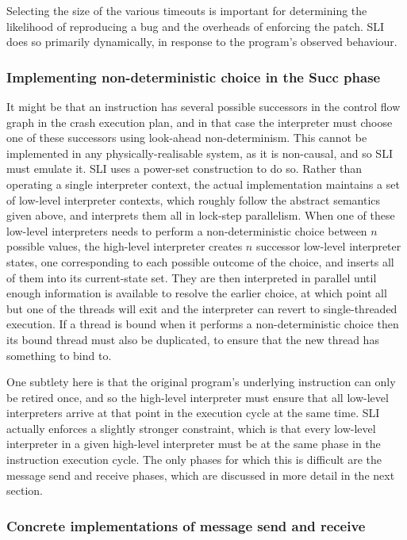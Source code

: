 Selecting the size of the various timeouts is important for determining the likelihood of reproducing a bug and the overheads of enforcing the patch.
SLI does so primarily dynamically, in response to the program's observed behaviour.

\subsubsection{Implementing non-deterministic choice in the Succ phase}

It might be that an instruction has several possible successors in the control flow graph in the crash execution plan, and in that case the interpreter must choose one of these successors using look-ahead non-determinism.
This cannot be implemented in any physically-realisable system, as it is non-causal, and so SLI must emulate it.
SLI uses a power-set construction to do so.
Rather than operating a single interpreter context, the actual implementation maintains a set of low-level interpreter contexts, which roughly follow the abstract semantics given above, and interprets them all in lock-step parallelism.
When one of these low-level interpreters needs to perform a non-deterministic choice between $n$ possible values, the high-level interpreter creates $n$ successor low-level interpreter states, one corresponding to each possible outcome of the choice, and inserts all of them into its current-state set.
They are then interpreted in parallel until enough information is available to resolve the earlier choice, at which point all but one of the threads will exit and the interpreter can revert to single-threaded execution.
If a thread is bound when it performs a non-deterministic choice then its bound thread must also be duplicated, to ensure that the new thread has something to bind to.

One subtlety here is that the original program's underlying instruction can only be retired once, and so the high-level interpreter must ensure that all low-level interpreters arrive at that point in the execution cycle at the same time.
SLI actually enforces a slightly stronger constraint, which is that every low-level interpreter in a given high-level interpreter must be at the same phase in the instruction execution cycle.
The only phases for which this is difficult are the message send and receive phases, which are discussed in more detail in the next section.

\subsubsection{Concrete implementations of message send and receive}

